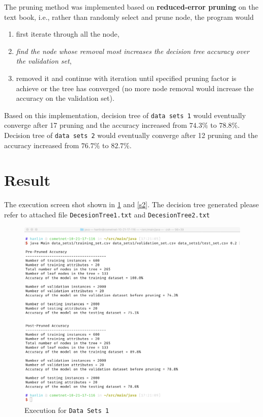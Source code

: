 \documentclass[12pt, letterpaper]{article}
\begin{document}
The pruning method was implemented based on \textbf{reduced-error pruning} on the text book, i.e., rather than randomly select and prune node, the program would 
\begin{enumerate}
    \item first iterate through all the node, 
    \item \emph{find the node whose removal most increases the decision tree accuracy over the validation set}, 
    \item removed it and continue with iteration until specified pruning factor is achieve or the tree has converged (no more node removal would increase the accuracy on the validation set).
\end{enumerate}

Based on this implementation, decision tree of \texttt{data sets 1} would eventually converge after 17 pruning and the accuracy increased from $74.3\%$ to $78.8\%$. Decision tree of \texttt{data sets 2} would eventually converge after 12 pruning and the accuracy increased from $76.7\%$ to $82.7\%$.

\section{Result}

The execution screen shot shown in \cref{s1} and \cref{s2}. The decision tree generated please refer to attached file \texttt{DecesionTree1.txt} and \texttt{DecesionTree2.txt}

\begin{figure}
\includegraphics[width=\textwidth]{dataset1.png}
\caption{Execution for \texttt{Data Sets 1}}\label{s1}
\end{figure}
\end{document}
